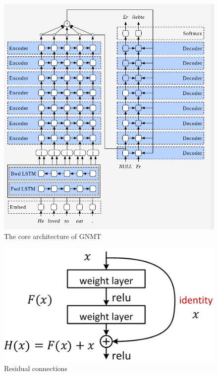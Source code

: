 \documentclass[conference]{IEEEtran}
\begin{document}
 \begin{figure}
  \centering
      \includegraphics[width=.9\linewidth]{img/gnmt_1.png} 
	\caption{The core architecture of GNMT }
	\label{fig:gnmt1}
\end{figure}

 \begin{figure}
  \centering
      \includegraphics[width=.9\linewidth]{img/residual.png} 
	\caption{Residual connections}
	\label{fig:residual}
\end{figure}
\end{document}
